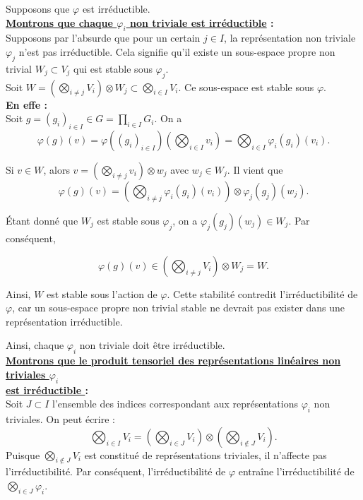 \documentclass[a4paper, 14pt]{report}
\begin{document}
\begin{onehalfspace}
{\begin{enumerate} [label=\roman*)]
				Supposons que \( \varphi \) est irréductible.\\ 		
				\textbf{\underline{Montrons que chaque \( \varphi_i \) non triviale est irréductible} :}\\
				Supposons par l'absurde que pour un certain \( j \in I \), la représentation non triviale \( \varphi_j \) n'est pas irréductible.  Cela signifie qu'il existe un sous-espace propre non trivial \( W_j \subset V_j \) qui est stable sous \( \varphi_j \).\\
				Soit
				\(
				W = \left( \bigotimes_{i \neq j} V_i \right) \otimes W_j \subset \bigotimes_{i \in I} V_i.
				\)
				Ce sous-espace est stable sous \( \varphi \).\\
				\textbf{En effe :}\\
				Soit \( g = (g_i)_{i \in I} \in G = \prod_{i \in I} G_i \). On a
				\[
				\varphi(g)(v) = \varphi((g_i)_{i \in I})\left( \bigotimes_{i \in I} v_i \right) = \bigotimes_{i \in I} \varphi_i(g_i)(v_i).
				\]
				
				Si \( v \in W \), alors \( v = \left( \bigotimes_{i \neq j} v_i \right) \otimes w_j \) avec \( w_j \in W_j \). Il vient que
				\[
				\varphi(g)(v) = \left( \bigotimes_{i \neq j} \varphi_i(g_i)(v_i) \right) \otimes \varphi_j(g_j)(w_j).
				\]
				
				Étant donné que \( W_j \) est stable sous \( \varphi_j \), on a \( \varphi_j(g_j)(w_j) \in W_j \). Par conséquent,
				
				\[
				\varphi(g)(v) \in \left( \bigotimes_{i \neq j} V_i \right) \otimes W_j = W.
				\]
				
				Ainsi, \( W \) est stable sous l'action de \( \varphi \). Cette stabilité contredit l'irréductibilité de \( \varphi \), car un sous-espace propre non trivial stable ne devrait pas exister dans une représentation irréductible.
				
				Ainsi, chaque \( \varphi_i \) non triviale doit être irréductible.\\
				
				\textbf{\underline{Montrons que le produit tensoriel des représentations linéaires non triviales  \( \varphi_i \)  }}\\
				\textbf{\underline{ est irréductible } :}\\			 
				Soit \( J \subset I \) l'ensemble des indices correspondant aux représentations \( \varphi_i \) non triviales.  
				On peut écrire :
				\[
				\bigotimes_{i \in I} V_i = \left( \bigotimes_{i \in J} V_i \right) \otimes \left( \bigotimes_{i \notin J} V_i \right).
				\]
				Puisque \( \bigotimes_{i \notin J} V_i \) est constitué de représentations triviales, il n’affecte pas l'irréductibilité. Par conséquent, l'irréductibilité de \( \varphi \) entraîne l'irréductibilité de \( \bigotimes_{i \in J} \varphi_i \).\\
				

\end{enumerate}}
\end{onehalfspace}
\end{document}
